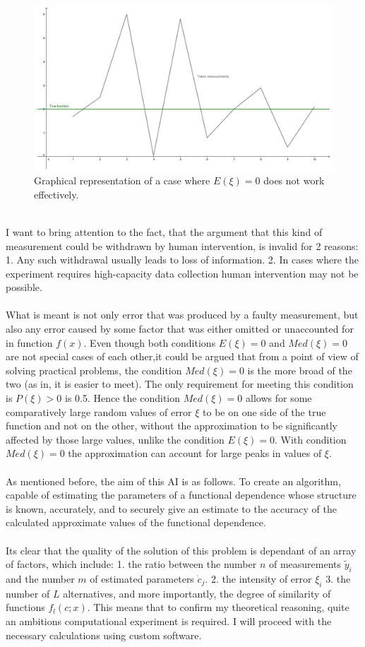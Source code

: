 \begin{figure}[h!]
\includegraphics[scale=0.1]{pic-naturallimits}
\centering
\caption{Graphical representation of a case where $E(\xi)=0$ does not work effectively.}
\label{fig:graph-nl}
\end{figure}
\\
I want to bring attention to the fact, that the argument that this kind of measurement could be withdrawn by human intervention, is invalid for 2 reasons: 1. Any such withdrawal usually leads to loss of information. 2. In cases where the experiment requires high-capacity data collection human intervention may not be possible.\\
\\
What is meant is not only error that was produced by a faulty measurement, but also any error caused by some factor that was either omitted or unaccounted for in function $f(x)$. Even though both conditions $E(\xi)=0$ and $Med(\xi)=0$ are not special cases of each other,it could be argued that from a point of view of solving practical problems, the condition $Med(\xi)=0$ is the more broad of the two (as in, it is easier to meet). The only requirement for meeting this condition is $P(\xi)>0$ is 0.5.  Hence the condition $Med(\xi)=0$ allows for some comparatively large random values of error $\xi$ to be on one side of the true function and not on the other, without the approximation to be significantly affected by those large values, unlike the condition $E(\xi)=0$. With condition $Med(\xi)=0$ the approximation can account for large peaks in values of $\xi$.\\
\\
As mentioned before, the aim of this AI is as follows. To create an algorithm, capable of estimating the parameters of a functional dependence whose structure is known, accurately,  and to securely give an estimate to the accuracy of the calculated approximate values of the functional dependence. \\
\\
Its clear that the quality of the solution of this problem is dependant of an array of factors, which include: 1. the ratio between the number $n$ of measurements $\tilde{y}_{i}$ and the number $m$ of estimated parameters $\dot{c}_{j}$. 2. the intensity of error $\xi_{i}$ 3. the number of $L$ alternatives, and more importantly, the degree of similarity of functions $f_{l}(c;x)$. This means that to confirm my theoretical reasoning, quite an ambitions computational experiment is required. I will proceed with the necessary calculations using custom software. 


